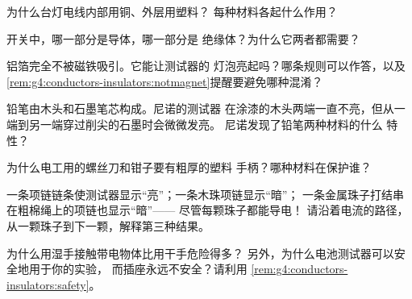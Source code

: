 \begin{exercise}[$\star$]\label{exo:g4:conductors-insulators:5}
为什么台灯电线内部用铜、外层用塑料？
每种材料各起什么作用？
\end{exercise}

\begin{exercise}[$\star$]\label{exo:g4:conductors-insulators:6}
开关中，哪一部分是导体，哪一部分是
绝缘体？为什么它两者都需要？
\end{exercise}

\begin{exercise}[$\star$]\label{exo:g4:conductors-insulators:7}
铝箔完全不被磁铁吸引。它能让测试器的
灯泡亮起吗？哪条规则可以作答，以及
\cref{rem:g4:conductors-insulators:notmagnet}提醒要避免哪种混淆？
\end{exercise}

\begin{exercise}[$\star$]\label{exo:g4:conductors-insulators:8}
铅笔由木头和石墨笔芯构成。尼诺的测试器
在涂漆的木头两端一直不亮，但从一端到另一端穿过削尖的石墨时会微微发亮。
尼诺发现了铅笔两种材料的什么
特性？
\end{exercise}

\begin{exercise}[$\star$]\label{exo:g4:conductors-insulators:9}
为什么电工用的螺丝刀和钳子要有粗厚的塑料
手柄？哪种材料在保护谁？
\end{exercise}

\begin{exercise}[$\star\star$]\label{exo:g4:conductors-insulators:10}
一条项链链条使测试器显示“亮”；一条木珠项链显示“暗”；
一条金属珠子打结串在粗棉绳上的项链也显示“暗”——
尽管每颗珠子都能导电！
请沿着电流的路径，
从一颗珠子到下一颗，解释第三种结果。
\end{exercise}

\begin{exercise}[$\star\star$]\label{exo:g4:conductors-insulators:11}
为什么用湿手接触带电物体比用干手危险得多？
另外，为什么电池测试器可以安全地用于你的实验，
而插座永远不安全？请利用
\cref{rem:g4:conductors-insulators:safety}。
\end{exercise}
